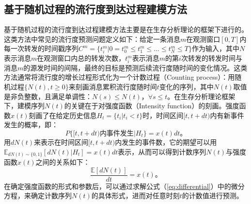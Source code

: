 \subsection{基于随机过程的流行度到达过程建模方法}
基于随机过程的流行度到达过程建模方法主要是在生存分析理论\citep{klein2005survival}的框架下进行的。这类方法中常见的流行度预测问题定义如下：给定一条消息$m$在观测窗口$[0,T]$内每一次转发的时间戳序列$C^m=\{t_i^m|0=t_0^m \le t_1^m \le...\le t_N^m \le T \}$作为输入，其中$N$表示消息$m$在观测窗口内总的转发次数，$t_i^m$表示消息$m$的第$i$次转发的转发时间与消息$m$的源发时间的间隔，最终的目标是预测后续流行度随时间的变化情况。这类方法通常将流行度的增长过程形式化为一个计数过程（Counting process）\citep{andersen1985counting}：用随机过程$\{N(t),t \ge 0\}$来刻画消息累积流行度随时间$t$变化的序列，其中$N(t)$取值是非负整数，且满足单调性：$N(s) \le N(t)\text{，} \forall s \le t$。在生存分析理论框架下，建模序列$N(t)$的关键在于对强度函数（Intensity function）的刻画。强度函数$x(t)$刻画了在给定历史信息$H_t=\{t_i|t_i < t \}$时，时间区间$[t,t+dt)$内有新事件发生的概率，即：
\begin{equation}
\label{eq:intensity}
P\{[t,t+dt)\text{内事件发生} | H_t\}=x(t)dt\text{。}
\end{equation}
用$dN(t)$来表示在时间区间$[t,t+dt)$内发生的事件数，它的期望可以用$\mathbb{E}_{dN(t) \sim \{0,1\}}[dN(t)|H_t]=x(t)dt$表示，从而可以得到计数序列$N(t)$与强度函数$x(t)$之间的关系如下：
\begin{equation}
\label{eq:differential}
\frac{\mathbb{E}[dN(t)]}{dt}=x(t)\text{。}
\end{equation}
在确定强度函数的形式和参数后，可以通过求解公式（\ref{eq:differential}）中的微分方程，来确定计数序列$N(t)$的具体形式，进而对任意时刻$t$的计数值进行预测。

